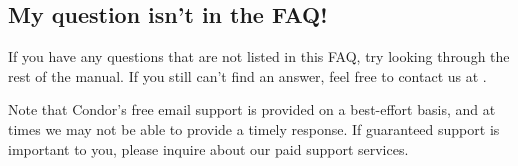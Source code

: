 
\subsection{My question isn't in the FAQ!}

If you have any questions that are not listed in this FAQ, try looking
through the rest of the manual.
If you still can't find an answer, feel free to contact us at
.

Note that Condor's free email support is provided on a best-effort
basis, and at times we may not be able to provide a timely response.
If guaranteed support is important to you, please inquire about our
paid support services.

